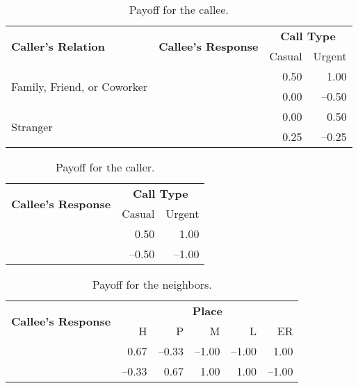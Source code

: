 \documentclass[11pt,          %
               phd,           %
               onehalfspacing %
               ]{ncsuthesis}
\newcommand{\cmark}{\ding{51}\xspace}%
\newcommand{\xmark}{\ding{55}\xspace}%
\newcommand{\fbf}{\textbf}
\begin{document}
\begin{table}[!htb]
\centering
\caption{Payoff for the callee.}
\label{tab:payoff-callee}
\begin{tabular}{lcrr}
\toprule
\multirow{2}{4.5cm}{\fbf{Caller's Relation}} &\multirow{2}{2.5cm}{\fbf{Callee's Response}}&\multicolumn{2}{c}{\fbf{Call Type}}\\
\cmidrule{3-4}
&&Casual&Urgent\\\midrule
\multirow{2}{4.5cm}{Family, Friend, or Coworker}&\cmark&0.50&1.00\\
&\xmark&0.00&--0.50\\\midrule
\multirow{2}{4.5cm}{Stranger}&\cmark&0.00&0.50\\
&\xmark&0.25&--0.25\\
\bottomrule
\end{tabular}
\end{table}

\begin{table}[!htb]
\centering
\caption{Payoff for the caller.}
\label{tab:payoff-caller}
\begin{tabular}{crr}
\toprule
\multirow{2}{*}{\fbf{Callee's Response}} &\multicolumn{2}{c}{\fbf{Call Type}}\\
\cmidrule{2-3}
&Casual&Urgent\\\midrule
\cmark&0.50&1.00\\
\xmark&--0.50&--1.00\\\bottomrule
\end{tabular}
\end{table}

\begin{table}[!htb]
\centering
\caption{Payoff for the neighbors.}
\label{tab:payoff-neighbor}
\begin{tabular}{crrrrr}
\toprule
\multirow{2}{*}{\fbf{Callee's Response}} &\multicolumn{5}{c}{\fbf{Place}}\\
\cmidrule{2-6}

& H & P & M & L & ER \\\midrule
\cmark&0.67&--0.33&--1.00&--1.00&1.00\\
\xmark&--0.33&0.67&1.00&1.00&--1.00\\\bottomrule

\end{tabular}
\end{table}
\end{document}
